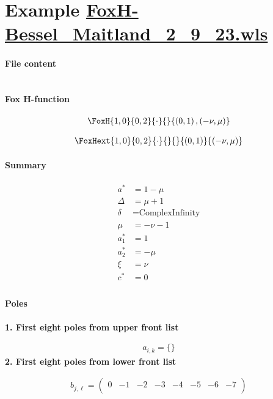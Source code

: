 \documentclass[11pt]{article}
\begin{document}
\section{Example \url{FoxH-Bessel_Maitland_2_9_23.wls}}

\paragraph{File content}

\inputminted{text}{FoxH-Bessel_Maitland_2_9_23.wls}

\paragraph{Fox H-function}

\begin{align*}
  \FoxH
    {1,0}
    {0,2}
    {\cdot}
    {}
    {\left(0, 1\right), \left(-\nu, \mu\right)}
\end{align*}

\begin{align*}
  \FoxHext
    {1,0}
    {0,2}
    {\cdot}
    {}
    {}
    {\left(0, 1\right)}
    {\left(-\nu, \mu\right)}
\end{align*}

\paragraph{Summary}

\begin{align*}
  a^*    & = 1-\mu \\
  \Delta & = \mu +1 \\
  \delta & = \text{ComplexInfinity} \\
  \mu    & = -\nu -1 \\
  a_1^*  & = 1 \\
  a_2^*  & = -\mu \\
  \xi    & = \nu \\
  c^*    & = 0 \\
\end{align*}

\paragraph{Poles}

\noindent\textbf{1. First eight poles from upper front list}

\begin{align*}
  a_{i,k} = 
  \{\}
\end{align*}
\noindent\textbf{2. First eight poles from lower front list}

\begin{align*}
  b_{j,\ell} = 
  \left(
\begin{array}{cccccccc}
 0 & -1 & -2 & -3 & -4 & -5 & -6 & -7 \\
\end{array}
\right)
\end{align*}

\printbibliography[title={References}]
\end{document}
